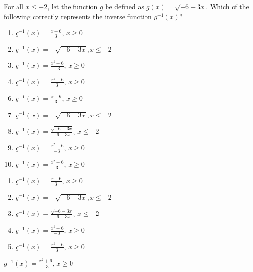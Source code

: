  
For all $x\leq -2$, let the function $g$ be defined as
$g(x)=\sqrt{-6-3x}$.  Which of the following correctly represents the inverse function $g^{-1}(x)$?


\ifsat
	\begin{enumerate}[label=\Alph*)]
		\item $g^{-1}(x)=${\Large$\frac{x-6}{3}$}, $x\geq0 $
		\item $g^{-1}(x)=-\sqrt{-6-3x}, x\leq-2 $
		\item $g^{-1}(x)=${\Large $\frac{x^2+6}{-3}$}, $x\geq0 $ %
		\item $g^{-1}(x)=${\Large $\frac{x^2-6}{3}$}, $x\geq0$
	\end{enumerate}
\else
\fi

\ifacteven
	\begin{enumerate}[label=\textbf{\Alph*.},itemsep=\fill,align=left]
		\setcounter{enumii}{5}
		\item $g^{-1}(x)=${\Large$\frac{x-6}{3}$}, $x\geq0 $
		\item $g^{-1}(x)=-\sqrt{-6-3x}, x\leq-2 $
		\item $g^{-1}(x)=${\Large$\frac{\sqrt{-6-3x}}{-6-3x}$}, $x\leq-2 $
		\addtocounter{enumii}{1}
		\item $g^{-1}(x)=${\Large $\frac{x^2+6}{-3}$}, $x\geq0 $ %
		\item $g^{-1}(x)=${\Large $\frac{x^2-6}{3}$}, $x\geq0$
	\end{enumerate}
\else
\fi

\ifactodd
	\begin{enumerate}[label=\textbf{\Alph*.},itemsep=\fill,align=left]
		\item $g^{-1}(x)=${\Large$\frac{x-6}{3}$}, $x\geq0 $
		\item $g^{-1}(x)=-\sqrt{-6-3x}, x\leq-2 $
		\item $g^{-1}(x)=${\Large$\frac{\sqrt{-6-3x}}{-6-3x}$}, $x\leq-2 $
		\item $g^{-1}(x)=${\Large $\frac{x^2+6}{-3}$}, $x\geq0 $ %
		\item $g^{-1}(x)=${\Large $\frac{x^2-6}{3}$}, $x\geq0$
	\end{enumerate}
\else
\fi

\ifgridin
 $g^{-1}(x)=${\Large $\frac{x^2+6}{-3}$}, $x\geq0 $ %
		
\else
\fi

